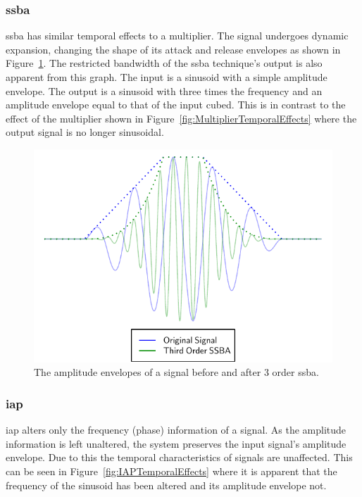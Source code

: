 		\subsubsection*{\acrshort{ssba}}
			\acrshort{ssba} has similar temporal effects to a multiplier. The signal undergoes dynamic
			expansion, changing the shape of its attack and release envelopes as shown in
			Figure~\ref{fig:SSBATemporalEffects}.  The restricted bandwidth of the \acrshort{ssba} technique's
			output is also apparent from this graph. The input is a sinusoid with a simple amplitude envelope.
			The output is a sinusoid with three times the frequency and an amplitude envelope equal to that of
			the input cubed. This is in contrast to the effect of the multiplier shown in
			Figure~\ref{fig:MultiplierTemporalEffects} where the output signal is no longer sinusoidal.

			\begin{figure}[h!]
				\centering
				\includegraphics{chapter5/Images/SSBATemporalEffects.pdf}
				\caption{The amplitude envelopes of a signal before and after 3 order
					 \acrshort{ssba}.}
				\label{fig:SSBATemporalEffects}
			\end{figure}

		\subsubsection*{\acrshort{iap}}
			\acrshort{iap} alters only the frequency (phase) information of a signal. As the amplitude
			information is left unaltered, the system preserves the input signal's amplitude envelope. Due to
			this the temporal characteristics of signals are unaffected. This can be seen in
			Figure~\ref{fig:IAPTemporalEffects} where it is apparent that the frequency of the sinusoid has
			been altered and its amplitude envelope not.

